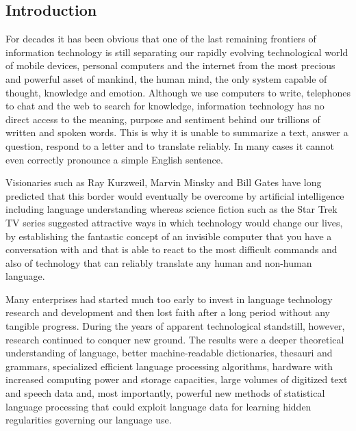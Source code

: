\documentclass[10pt, plain]{../../metanetpaper}
\begin{document}
\clearpage



\label{sec:pts}


\begin{multicols}{2}
\subsection{Introduction}
\label{sec:pt-introduction}

For decades it has been obvious that one of the last remaining frontiers of information technology is still
separating our rapidly evolving technological world of mobile devices, personal computers and the internet from the most precious and powerful asset of mankind, the human mind, the only system capable of thought, knowledge and emotion. Although we use computers to write, telephones to chat and the web to search for knowledge, information technology has no direct access to the meaning, purpose and sentiment behind our trillions of written and spoken words. This is why it is unable to summarize a text, answer a question, respond to a letter and to translate reliably. In many cases it cannot even correctly pronounce a simple English sentence.

Visionaries such as Ray Kurzweil, Marvin Minsky and Bill Gates have long predicted that this border would eventually be overcome by artificial intelligence including language understanding whereas science fiction such as the Star Trek TV series suggested attractive ways in which technology would change our lives, by establishing the fantastic concept of an invisible computer that you have a conversation with and that is able to react to the most difficult commands and also of technology that can reliably translate any human and non-human language.

Many enterprises had started much too early to invest in language technology research and development and then lost faith after a long period without any tangible progress. During the years of apparent technological standstill, however, research continued to conquer new ground. The results were a deeper theoretical understanding of language, better machine-readable dictionaries, thesauri and grammars, specialized efficient language processing algorithms, hardware with increased computing power and storage capacities, large volumes of digitized text and speech data and, most importantly, powerful new methods of statistical language processing that could exploit language data for learning hidden regularities governing our language use.


\end{multicols}
\end{document}
